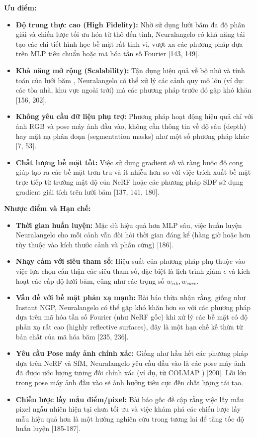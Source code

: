 \textbf{Ưu điểm:}
\begin{itemize}
    \item \textbf{Độ trung thực cao (High Fidelity):} Nhờ sử dụng lưới băm đa độ phân giải và chiến lược tối ưu hóa từ thô đến tinh, Neuralangelo có khả năng tái tạo các chi tiết hình học bề mặt rất tinh vi, vượt xa các phương pháp dựa trên MLP tiêu chuẩn hoặc mã hóa tần số Fourier [143, 149].
    \item \textbf{Khả năng mở rộng (Scalability):} Tận dụng hiệu quả về bộ nhớ và tính toán của lưới băm \cite{Muller22InstantNGP}, Neuralangelo có thể xử lý các cảnh quy mô lớn (ví dụ: các tòa nhà, khu vực ngoài trời) mà các phương pháp trước đó gặp khó khăn [156, 202].
    \item \textbf{Không yêu cầu dữ liệu phụ trợ:} Phương pháp hoạt động hiệu quả chỉ với ảnh RGB và pose máy ảnh đầu vào, không cần thông tin về độ sâu (depth) hay mặt nạ phân đoạn (segmentation masks) như một số phương pháp khác \cite{Li23Neuralangelo_Abstract, Fu22GeoNeuS, Yu22MonoSDF} [7, 53].
    \item \textbf{Chất lượng bề mặt tốt:} Việc sử dụng gradient số và ràng buộc độ cong giúp tạo ra các bề mặt trơn tru và ít nhiễu hơn so với việc trích xuất bề mặt trực tiếp từ trường mật độ của NeRF hoặc các phương pháp SDF sử dụng gradient giải tích trên lưới băm [137, 141, 180].
\end{itemize}

\textbf{Nhược điểm và Hạn chế:}
\begin{itemize}
    \item \textbf{Thời gian huấn luyện:} Mặc dù hiệu quả hơn MLP sâu, việc huấn luyện Neuralangelo cho mỗi cảnh vẫn đòi hỏi thời gian đáng kể (hàng giờ hoặc hơn tùy thuộc vào kích thước cảnh và phần cứng) [186].
    \item \textbf{Nhạy cảm với siêu tham số:} Hiệu suất của phương pháp phụ thuộc vào việc lựa chọn cẩn thận các siêu tham số, đặc biệt là lịch trình giảm $\epsilon$ và kích hoạt các cấp độ lưới băm, cũng như các trọng số $w_{eik}, w_{curv}$.
    \item \textbf{Vấn đề với bề mặt phản xạ mạnh:} Bài báo thừa nhận rằng, giống như Instant NGP, Neuralangelo có thể gặp khó khăn hơn so với các phương pháp dựa trên mã hóa tần số Fourier (như NeRF gốc) khi xử lý các bề mặt có độ phản xạ rất cao (highly reflective surfaces), đây là một hạn chế kế thừa từ bản chất của mã hóa băm [235, 236].
    \item \textbf{Yêu cầu Pose máy ảnh chính xác:} Giống như hầu hết các phương pháp dựa trên NeRF và SfM, Neuralangelo yêu cầu đầu vào là các pose máy ảnh đã được ước lượng tương đối chính xác (ví dụ, từ COLMAP \cite{Schonberger16SFMRevisited}) [200]. Lỗi lớn trong pose máy ảnh đầu vào sẽ ảnh hưởng tiêu cực đến chất lượng tái tạo.
    \item \textbf{Chiến lược lấy mẫu điểm/pixel:} Bài báo gốc đề cập rằng việc lấy mẫu pixel ngẫu nhiên hiện tại chưa tối ưu và việc khám phá các chiến lược lấy mẫu hiệu quả hơn là một hướng nghiên cứu trong tương lai để tăng tốc độ huấn luyện [185-187].
\end{itemize}

